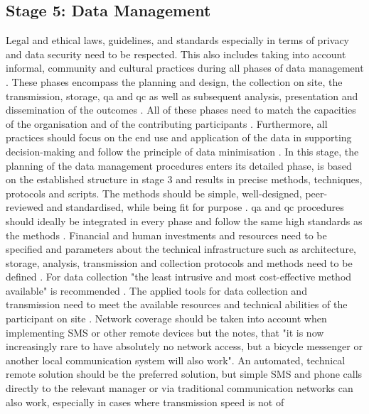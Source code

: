 \subsection{Stage 5: Data Management}

Legal and ethical laws, guidelines, and standards especially in terms of privacy and data security need to be respected. This also includes taking into account informal, community and cultural practices during all phases of data management \autocite[017]{ifrcCommunityBasedSurveillanceGuiding2017}. These phases encompass the planning and design, the collection on site, the transmission, storage, \acrfull{qa} and \acrfull{qc} as well as subsequent analysis, presentation and dissemination of the outcomes \autocite{fraislCitizenScienceEnvironmental2022}.\newline
All of these phases need to match the capacities of the organisation and of the contributing participants \autocite{ifrcCommunityBasedSurveillanceGuiding2017,minkmanCitizenScienceWater2015}. Furthermore, all practices should focus on the end use and application of the data in supporting decision-making and follow the principle of data minimisation \autocite{edpsGlossaryEuropeanData2023,ifrcCommunityBasedSurveillanceGuiding2017,minkmanCitizenScienceWater2015}. In this stage, the planning of the data management procedures enters its detailed phase, is based on the established structure in stage 3 and results in precise methods, techniques, protocols and scripts. The methods should be simple, well-designed, peer-reviewed and standardised, while being fit for purpose \autocite{fraislCitizenScienceEnvironmental2022,ifrcCommunityBasedSurveillanceGuiding2017,silvertownNewDawnCitizen2009,whitelawEstablishingCanadianCommunity2003}. \acrshort{qa} and \acrshort{qc} procedures should ideally be integrated in every phase and follow the same high standards as the methods \autocite{fraislCitizenScienceEnvironmental2022,mackechnieRoleBigSociety2011,sharpeCommunityBasedEcological2006,silvertownNewDawnCitizen2009}. Financial and human investments and resources need to be specified and parameters about the technical infrastructure such as architecture, storage, analysis, transmission and collection protocols and methods need to be defined \autocite{fraislCitizenScienceEnvironmental2022,sharpeCommunityBasedEcological2006}. For data collection "the least intrusive and most cost-effective method available" is recommended \autocite[27]{ifrcCommunityBasedSurveillanceGuiding2017}. The applied tools for data collection and transmission need to meet the available resources and technical abilities of the participant on site \autocite{ifrcCommunityBasedSurveillanceGuiding2017,minkmanCitizenScienceWater2015}. Network coverage should be taken into account when implementing SMS or other remote devices but the \autocite[26]{ifrcCommunityBasedSurveillanceGuiding2017} notes, that "it is now increasingly rare to have absolutely no network access, but a bicycle messenger or another local communication system will also work". An automated, technical remote solution should be the preferred solution, but simple SMS and phone calls directly to the relevant manager or via traditional communication networks can also work, especially in cases where transmission speed is not of 